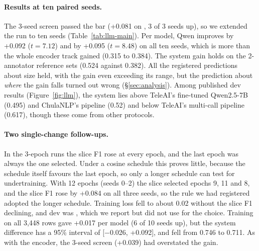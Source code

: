 \paragraph{Results at ten paired seeds.}
The 3-seed screen passed the bar (+0.081 on \Stwo{}, 3 of 3 seeds up), so we extended the run to ten seeds (Table~\ref{tab:llm-main}).
Per model, Qwen improves \Stwo{} by +0.092 ($t=7.12$) and \Sone{} by +0.095 ($t=8.48$) on all ten seeds, which is more than the whole encoder track gained (0.315 to 0.384).
The system gain holds on the 2-annotator reference sets (0.524 against 0.382).
All the registered predictions about size held, with the \Sone{} gain even exceeding its range, but the prediction about \emph{where} the gain falls turned out wrong (\S\ref{sec:analysis}).
Among published dev results (Figure~\ref{fig:llm}), the system lies above TeleAI's fine-tuned Qwen2.5-7B (0.495) and ChulaNLP's pipeline (0.52) and below TeleAI's multi-call pipeline (0.617), though these come from other protocols.

\FigureLLM

\paragraph{Two single-change follow-ups.}
In the 3-epoch runs the slice F1 rose at every epoch, and the last epoch was always the one selected.
Under a cosine schedule this proves little, because the schedule itself favours the last epoch, so only a longer schedule can test for undertraining.
With 12 epochs (seeds 0--2) the slice selected epochs 9, 11 and 8, and the slice F1 rose by +0.084 on all three seeds, so the rule we had registered adopted the longer schedule.
Training loss fell to about 0.02 without the slice F1 declining, and dev \Stwo{} was , which we report but did not use for the choice.
Training on all 3,448 rows gave +0.017 per model (6 of 10 seeds up), but the system difference has a 95\% interval of [$-$0.026, +0.092], and \Sone{} fell from 0.746 to 0.711.
As with the encoder, the 3-seed screen (+0.039) had overstated the gain.
